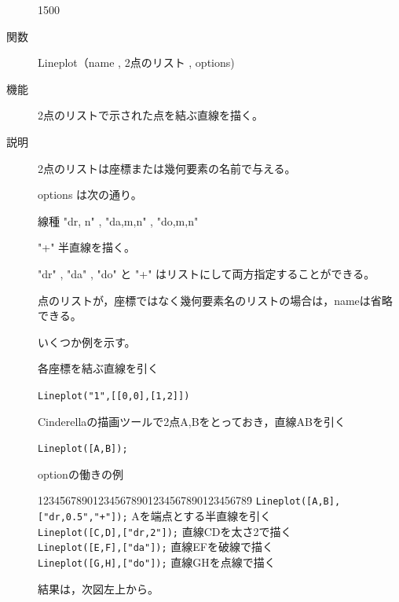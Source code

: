 \documentclass[papersize,a4paper,12pt,uplatex]{jsarticle}
\begin{document}
\begin{description}
\vspace{75mm}
\begin{layer}{150}{0}
\end{layer}

\vspace{70mm}

\vspace{\baselineskip}
\hypertarget{lineplot}{}
\item[関数]  Lineplot（name , 2点のリスト , options)
\item[機能]  2点のリストで示された点を結ぶ直線を描く。
\item[説明]  2点のリストは座標または幾何要素の名前で与える。

options は次の通り。

線種      "dr, n"  , "da,m,n" , "do,m,n"

 "+"        半直線を描く。

"dr" , "da" , "do" と "+" はリストにして両方指定することができる。

点のリストが，座標ではなく幾何要素名のリストの場合は，nameは省略できる。

いくつか例を示す。

\vspace{\baselineskip}
各座標を結ぶ直線を引く

\hspace{5mm} \verb|Lineplot("1",[[0,0],[1,2]])|

Cinderellaの描画ツールで2点A,Bをとっておき，直線ABを引く

\hspace{5mm} \verb|Lineplot([A,B]);| 

optionの働きの例
\begin{tabbing}
1234\=56789012345678901234567890123456789\=\kill
 \> \verb|Lineplot([A,B],["dr,0.5","+"]);|    \>Aを端点とする半直線を引く\\
 \> \verb|Lineplot([C,D],["dr,2"]);|        \>直線CDを太さ2で描く\\
 \> \verb|Lineplot([E,F],["da"]);|         \>直線EFを破線で描く\\
 \> \verb|Lineplot([G,H],["do"]);|        \>直線GHを点線で描く
\end{tabbing}
結果は，次図左上から。


\end{description}
\end{document}
